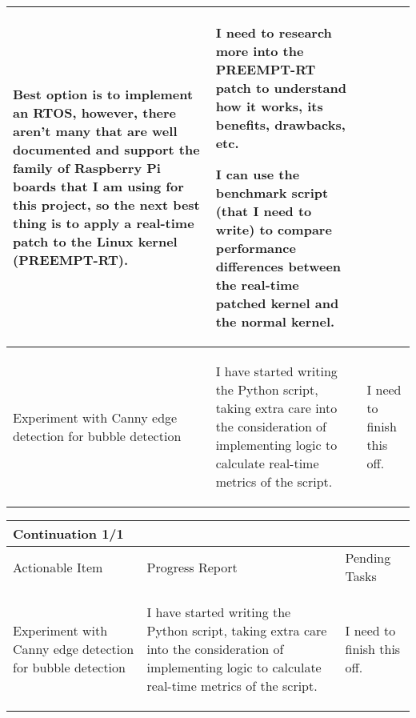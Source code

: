 \begin{table}[!h]
\begin{tabularx}{\textwidth}{|X|X|X|}
\begin{myitemize}
            \item Best option is to implement an RTOS, however, there aren't many that are well documented and support the family of Raspberry Pi boards that I am using for this project, so the next best thing is to apply a real-time patch to the Linux kernel (PREEMPT-RT).
        \end{myitemize} &
        \begin{myitemize}
            \item I need to research more into the PREEMPT-RT patch to understand how it works, its benefits, drawbacks, etc.
            \item I can use the benchmark script (that I need to write) to compare performance differences between the real-time patched kernel and the normal kernel.
        \end{myitemize} \\
        \hline
        Experiment with Canny edge detection for bubble detection & 
        \begin{myitemize}
            \item I have started writing the Python script, taking extra care into the consideration of implementing logic to calculate real-time metrics of the script.
        \end{myitemize} &
        \begin{myitemize}
            \item I need to finish this off.
        \end{myitemize} \\
    \end{tabularx}
\end{table}

\pagebreak

\begin{table}[!h]
    \centering
    \begin{tabularx}{\textwidth}{|X|X|X|}
        \hline
        Continuation 1/1 \\
        \hline
        \hline
        Actionable Item & Progress Report & Pending Tasks \\
        \hline
        \hline
        Experiment with Canny edge detection for bubble detection & 
        \begin{myitemize}
            \item I have started writing the Python script, taking extra care into the consideration of implementing logic to calculate real-time metrics of the script.
        \end{myitemize} &
        \begin{myitemize}
            \item I need to finish this off.
        \end{myitemize} \\
    \end{tabularx}
\end{table}

